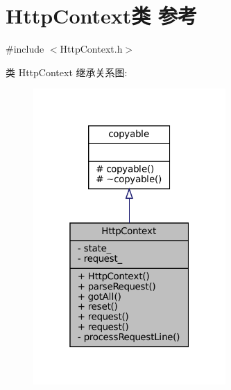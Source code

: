\hypertarget{classmuduo_1_1net_1_1HttpContext}{}\section{Http\+Context类 参考}
\label{classmuduo_1_1net_1_1HttpContext}


{\ttfamily \#include $<$Http\+Context.\+h$>$}



类 Http\+Context 继承关系图\+:
\nopagebreak
\begin{figure}[H]
\begin{center}
\leavevmode
\includegraphics[width=208pt]{classmuduo_1_1net_1_1HttpContext__inherit__graph}
\end{center}
\end{figure}


